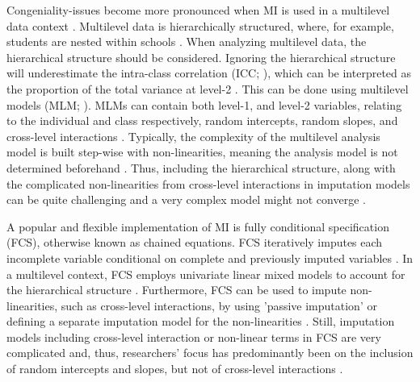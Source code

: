 \documentclass[10pt, a4paper, titlepage]{article}
\begin{document}
Congeniality-issues become more pronounced when MI is used in a multilevel data context \citep{mistlerComparisonJointModel2017, enders2018, enders2018a, enders2020, buurenFlexibleImputationMissing2018, taljaard2008, enders2016, resche-rigon2018, audigier2018, dong2023, grund2016, grund2018a, grund2018, ludtke2017, grund2021, quartagno2022}. Multilevel data is hierarchically structured, where, for example, students are nested within schools \citep{hox2017, hox2011}. When analyzing multilevel data, the hierarchical structure should be considered. Ignoring the hierarchical structure will underestimate the intra-class correlation (ICC; \citealt{buurenFlexibleImputationMissing2018, ludtke2017, taljaard2008, hox2011}), which can be interpreted as the proportion of the total variance at level-2 \citep{gulliford2005, shieh2012, hox2011}. This can be done using multilevel models (MLM; \citealt{hox2017, hox2011, ludtke2017}). MLMs can contain both level-1, and level-2 variables, relating to the individual and class respectively, random intercepts, random slopes, and cross-level interactions \citep{hox2017, hox2011}. Typically, the complexity of the multilevel analysis model is built step-wise with non-linearities, meaning the analysis model is not determined beforehand \citep{hox2017, hox2011}. Thus, including the hierarchical structure, along with the complicated non-linearities from cross-level interactions in imputation models can be quite challenging \citep{buurenFlexibleImputationMissing2018, burgette2010, hox2011} and a very complex model might not converge \citep{buurenFlexibleImputationMissing2018}.

A popular and flexible implementation of MI is fully conditional specification (FCS), otherwise known as chained equations\citep{audigier2018, burgette2010, vanbuuren2007, grund2018a}. FCS iteratively imputes each incomplete variable conditional on complete and previously imputed variables \citep{mistlerComparisonJointModel2017, buurenFlexibleImputationMissing2018, enders2016, enders2018, enders2018a, hughes2014, grund2018a}. In a multilevel context, FCS employs univariate linear mixed models to account for the hierarchical structure \citep{mistlerComparisonJointModel2017, enders2018, resche-rigon2018}. Furthermore, FCS can be used to impute non-linearities, such as cross-level interactions, by using 'passive imputation' or defining a separate imputation model for the non-linearities \citep{buurenFlexibleImputationMissing2018, grund2018}. Still, imputation models including cross-level interaction or non-linear terms in FCS are very complicated \citep{grund2021, grund2018} and, thus, researchers' focus has predominantly been on the inclusion of random intercepts and slopes, but not of cross-level interactions \citep{grund2018a, grund2016, enders2018, enders2018a, enders2020, enders2016}.
\end{document}
